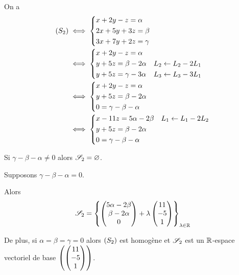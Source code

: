 \begin{corr}[2]
On a \[\begin{aligned}
\left(S_2\right)&\iff\begin{dcases}
x+2y-z=\alpha \\
2x+5y+3z=\beta \\
3x+7y+2z=\gamma
\end{dcases} \\
&\iff\begin{dcases}
x+2y-z=\alpha \\
y+5z=\beta-2\alpha &L_2\gets L_2-2L_1 \\
y+5z=\gamma-3\alpha &L_3\gets L_3-3L_1
\end{dcases} \\
&\iff\begin{dcases}
x+2y-z=\alpha \\
y+5z=\beta-2\alpha \\
0=\gamma-\beta-\alpha
\end{dcases} \\
&\iff\begin{dcases}
x-11z=5\alpha-2\beta &L_1\gets L_1-2L_2 \\
y+5z=\beta-2\alpha \\
0=\gamma-\beta-\alpha
\end{dcases}
\end{aligned}\]

Si \(\gamma-\beta-\alpha\not=0\) alors \(\mathscr{S}_2=\varnothing\).

Supposons \(\gamma-\beta-\alpha=0\).

Alors \[\mathscr{S}_2=\left\lbrace\begin{pmatrix}5\alpha-2\beta\\\beta-2\alpha\\0\end{pmatrix}+\lambda\begin{pmatrix}11\\-5\\1\end{pmatrix}\right\rbrace_{\lambda\in\mathbb{R}}\]

De plus, si \(\alpha=\beta=\gamma=0\) alors \(\left(S_2\right)\) est homogène et \(\mathscr{S}_2\) est un \(\mathbb{R}\)-espace vectoriel de base \(\left(\begin{pmatrix}11\\-5\\1\end{pmatrix}\right)\).
\end{corr}

